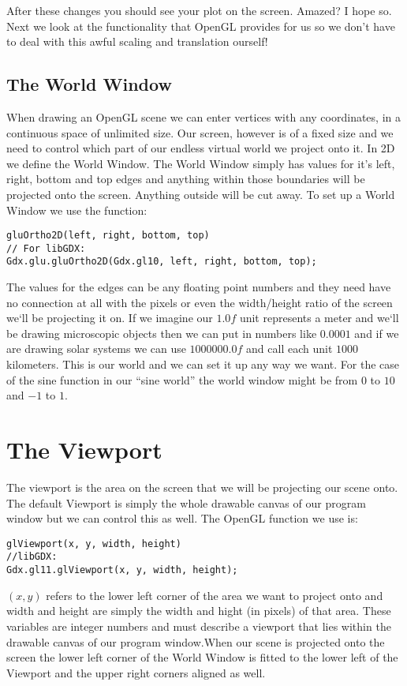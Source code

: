 \documentclass[11pt,a4paper]{article}
\begin{document}
After these changes you should see your plot on the screen. Amazed? I hope so.
Next we look at the functionality that OpenGL provides for us so we don't have
to deal with this awful scaling and translation ourself!

\subsection{The World Window}
When drawing an OpenGL scene we can enter vertices with any coordinates, in a
continuous space of unlimited size. Our screen, however is of a fixed size and
we need to control which part of our endless virtual world we project onto it.
In 2D we define the World Window. The World Window simply has values for it's
left, right, bottom and top edges and anything within those boundaries will be
projected onto the screen. Anything outside will be cut away. To set up a World
Window we use the function:
\begin{lstlisting}
gluOrtho2D(left, right, bottom, top)
// For libGDX:
Gdx.glu.gluOrtho2D(Gdx.gl10, left, right, bottom, top);
\end{lstlisting}
The values for the edges can be any floating point numbers and they need have
no connection at all with the pixels or even the width/height ratio of the
screen we‘ll be projecting it on. If we imagine our $1.0f$ unit represents a
meter and we‘ll be drawing microscopic objects then we can put in numbers like
$0.0001$ and if we are drawing solar systems we can use $1000000.0f$ and call each
unit $1000$ kilometers. This is our world and we can set it up any way we want.
For the case of the sine function in our ``sine world'' the world window might
be from $0$ to $10$ and $-1$ to $1$.

\section{The Viewport}
The viewport is the area on the screen that we will be projecting our scene
onto. The default Viewport is simply the whole drawable canvas of our program
window but we can control this as well. The OpenGL function we use is:
\begin{lstlisting}
glViewport(x, y, width, height)
//libGDX:
Gdx.gl11.glViewport(x, y, width, height);
\end{lstlisting}
$(x,y)$ refers to the lower left corner of the area we want to project onto and
width and height are simply the width and hight (in pixels) of that area. These
variables are integer numbers and must describe a viewport that lies within the
drawable canvas of our program window.When our scene is projected onto the
screen the lower left corner of the World Window is fitted to the lower left of
the Viewport and the upper right corners aligned as well.
\end{document}

